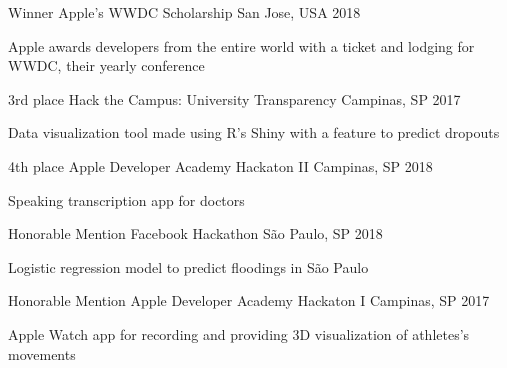 \begin{cvhonors}

  \cvhonor
    {Winner}
    {Apple's WWDC Scholarship}
    {San Jose, USA}
    {2018}

  \cvhonor
    { }
    {
      \begin{cvitems}
        \item {Apple awards developers from the entire world with a ticket and lodging for WWDC, their yearly conference}
      \end{cvitems}
    }
    { }{ }

  \cvhonor
    {3rd place}
    {Hack the Campus: University Transparency}
    {Campinas, SP}
    {2017}

  \cvhonor
    { }
    {
      \begin{cvitems}
        \item {Data visualization tool made using R's Shiny with a feature to predict dropouts}
      \end{cvitems}
    }
    { }{ }

  \cvhonor
    {4th place}
    {Apple Developer Academy Hackaton II}
    {Campinas, SP}
    {2018}

  \cvhonor
    { }
    {
      \begin{cvitems}
        \item {Speaking transcription app for doctors}
      \end{cvitems}
    }
    { }{ }



  \cvhonor
    {Honorable Mention}
    {Facebook Hackathon}
    {São Paulo, SP}
    {2018}

  \cvhonor
    { }
    {
      \begin{cvitems}
        \item {Logistic regression model to predict floodings in São Paulo}
      \end{cvitems}
    }
    { }{ }

  \cvhonor
    {Honorable Mention}
    {Apple Developer Academy Hackaton I}
    {Campinas, SP}
    {2017}

  \cvhonor
    { }
    {
      \begin{cvitems}
        \item {Apple Watch app for recording and providing 3D visualization of athletes's movements}
      \end{cvitems}
    }
    { }{ }

\end{cvhonors}
